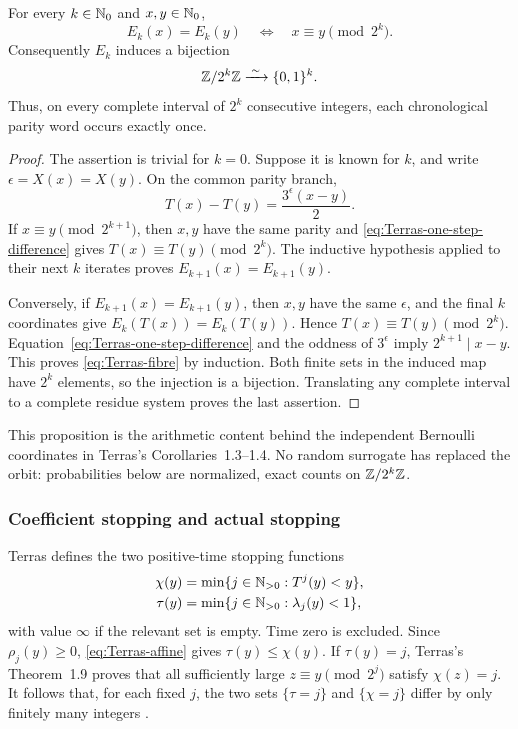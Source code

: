 \begin{proposition}
\label{prop:Terras-parity-coordinate}
For every \(k\in\mathbb{N}_{0}\) and \(x,y\in\mathbb{N}_{0}\),
\begin{equation}
\label{eq:Terras-fibre}
 E_k(x)=E_k(y)
 \quad\Longleftrightarrow\quad
 x\equiv y\pmod{2^k}.
\end{equation}
Consequently \(E_k\) induces a bijection
\[
 \mathbb{Z}/2^k\mathbb{Z}\xrightarrow{\;\sim\;}\{0,1\}^k.
\]
Thus, on every complete interval of \(2^k\) consecutive integers, each
chronological parity word occurs exactly once.
\end{proposition}

\begin{proof}
The assertion is trivial for \(k=0\).  Suppose it is known for \(k\), and
write \(\epsilon=X(x)=X(y)\).  On the common parity branch,
\begin{equation}
\label{eq:Terras-one-step-difference}
 T(x)-T(y)=\frac{3^\epsilon(x-y)}2.
\end{equation}
If \(x\equiv y\pmod{2^{k+1}}\), then \(x,y\) have the same parity and
\eqref{eq:Terras-one-step-difference} gives
\(T(x)\equiv T(y)\pmod{2^k}\).  The inductive hypothesis applied to their
next \(k\) iterates proves \(E_{k+1}(x)=E_{k+1}(y)\).

Conversely, if \(E_{k+1}(x)=E_{k+1}(y)\), then \(x,y\) have the same
\(\epsilon\), and the final \(k\) coordinates give
\(E_k(T(x))=E_k(T(y))\).  Hence \(T(x)\equiv T(y)\pmod{2^k}\).
Equation~\eqref{eq:Terras-one-step-difference} and the oddness of
\(3^\epsilon\) imply \(2^{k+1}\mid x-y\).  This proves
\eqref{eq:Terras-fibre} by induction.  Both finite sets in the induced map
have \(2^k\) elements, so the injection is a bijection.  Translating any
complete interval to a complete residue system proves the last assertion.
\end{proof}

This proposition is the arithmetic content behind the independent
Bernoulli coordinates in Terras's Corollaries~1.3--1.4.  No random surrogate
has replaced the orbit: probabilities below are normalized, exact counts on
\(\mathbb{Z}/2^k\mathbb{Z}\).

\subsubsection{Coefficient stopping and actual stopping}

Terras defines the two positive-time stopping functions
\begin{align}
 \chi(y)&=\min\{j\in\mathbb{N}_{>0}:T^j(y)<y\},                    \label{eq:Terras-chi}\\
 \tau(y)&=\min\{j\in\mathbb{N}_{>0}:\lambda_j(y)<1\},              \label{eq:Terras-tau}
\end{align}
with value \(\infty\) if the relevant set is empty.  Time zero is excluded.
Since \(\rho_j(y)\ge0\), \eqref{eq:Terras-affine} gives
\(\tau(y)\le\chi(y)\).  If \(\tau(y)=j\), Terras's Theorem~1.9 proves that
all sufficiently large \(z\equiv y\pmod{2^j}\) satisfy \(\chi(z)=j\).
It follows that, for each fixed \(j\), the two sets
\(\{\tau=j\}\) and \(\{\chi=j\}\) differ by only finitely many integers
\cite[pp.~243--244]{Terras1976}.

